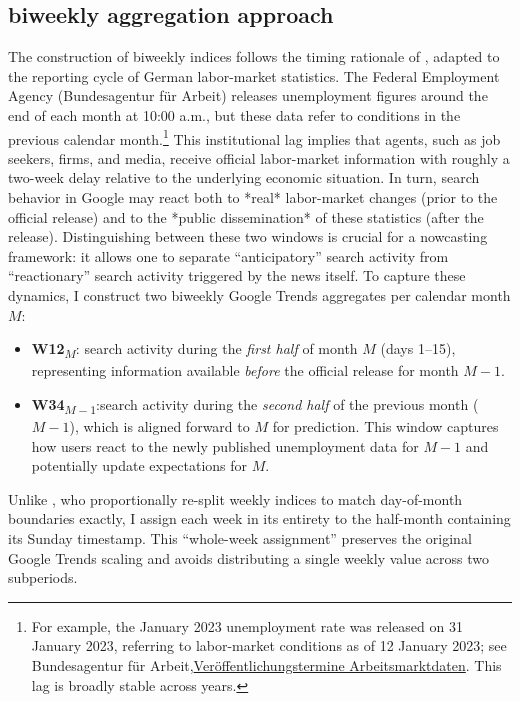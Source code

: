 \documentclass[12pt,a4paper]{article}
\begin{document}
\subsection{biweekly aggregation approach}
The construction of biweekly indices follows the timing rationale of \cite{Zimmermann2009}, adapted to the reporting cycle of German labor-market statistics. The Federal Employment Agency (Bundesagentur für Arbeit) releases unemployment figures around the end of each month at 10:00 a.m., but these data refer to conditions in the previous calendar month.\footnote{For example, the January 2023 unemployment rate was released on 31 January 2023, referring to labor-market conditions as of 12 January 2023; see Bundesagentur für Arbeit,\href{https://statistik.arbeitsagentur.de/DE/Navigation/Service/Veroeffentlichungskalender/Veroeffentlichungskalender-Nav.html}{Veröffentlichungstermine Arbeitsmarktdaten}. This lag is broadly stable across years.}
This institutional lag implies that agents, such as job seekers, firms, and media, receive official labor-market information with roughly a two-week delay relative to the underlying economic situation. In turn, search behavior in Google may react both to *real* labor-market changes (prior to the official release) and to the *public dissemination* of these statistics (after the release). Distinguishing between these two windows is crucial for a nowcasting framework: it allows one to separate ``anticipatory'' search activity from ``reactionary'' search activity triggered by the news itself.
\newpage
To capture these dynamics, I construct two biweekly Google Trends aggregates per calendar month $M$:
\begin{itemize}
    \item \textbf{W12\textsubscript{$M$}}: search activity during the \emph{first half} of month $M$ (days 1–15), representing information available \emph{before} the official release for month $M{-}1$.
    \item \textbf{W34\textsubscript{$M-1$}}:search activity during the \emph{second half} of the previous month ($M{-}1$), which is aligned forward to $M$ for prediction. This window captures how users react to the newly published unemployment data for $M{-}1$ and potentially update expectations for $M$.
\end{itemize}
Unlike \cite{Zimmermann2009}, who proportionally re-split weekly indices to match day-of-month boundaries exactly, I assign each week in its entirety to the half-month containing its Sunday timestamp. This ``whole-week assignment'' preserves the original Google Trends scaling and avoids distributing a single weekly value across two subperiods.\\
\end{document}
